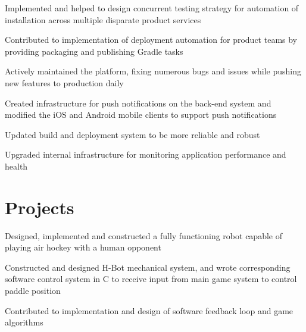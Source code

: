 \documentclass[letterpaper]{deedy-resume} %
\begin{document}
\begin{minipage}[t]{0.66\textwidth}
\sectionspace %

\begin{tightitemize}
\item Implemented and helped to design concurrent testing strategy for automation of installation across multiple disparate product services
\item Contributed to implementation of deployment automation for product teams by providing packaging and publishing Gradle tasks
\end{tightitemize}

\sectionspace %



\begin{tightitemize}
\item Actively maintained the platform, fixing numerous bugs and issues while pushing new features to production daily
\item Created infrastructure for push notifications on the back-end system and modified the iOS and Android mobile clients to support push notifications
\item Updated build and deployment system to be more reliable and robust
\item Upgraded internal infrastructure for monitoring application performance and health
\end{tightitemize}



\section{Projects}

\begin{tightitemize}
\item Designed, implemented and constructed a fully functioning robot capable of playing air hockey with a human opponent
\item Constructed and designed H-Bot mechanical system, and wrote corresponding software control system in C to receive input from main game system to control paddle position
\item Contributed to implementation and design of software feedback loop and game algorithms
\end{tightitemize}


\end{minipage}
\end{document}
